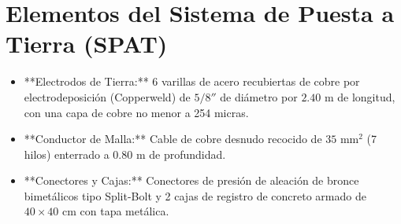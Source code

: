 \section{Elementos del Sistema de Puesta a Tierra (SPAT)}
\begin{itemize}
    \item **Electrodos de Tierra:** 6 varillas de acero recubiertas de cobre por electrodeposición (Copperweld) de $5/8''$ de diámetro por $2.40\text{ m}$ de longitud, con una capa de cobre no menor a 254 micras.
    \item **Conductor de Malla:** Cable de cobre desnudo recocido de $35\text{ mm}^2$ (7 hilos) enterrado a $0.80\text{ m}$ de profundidad.
    \item **Conectores y Cajas:** Conectores de presión de aleación de bronce bimetálicos tipo Split-Bolt y 2 cajas de registro de concreto armado de $40 \times 40\text{ cm}$ con tapa metálica.
\end{itemize}
